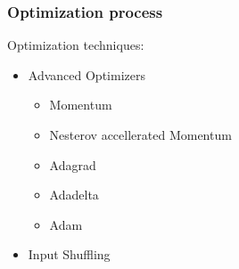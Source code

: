 \begin{frame}
\frametitle{Optimization process}
Optimization techniques:
\begin{itemize}
\item Advanced Optimizers
\begin{itemize}
\item Momentum
\item Nesterov accellerated Momentum 
\item Adagrad 
\item Adadelta
\item Adam
\end{itemize}
\item Input Shuffling
\end{itemize}
\end{frame}
